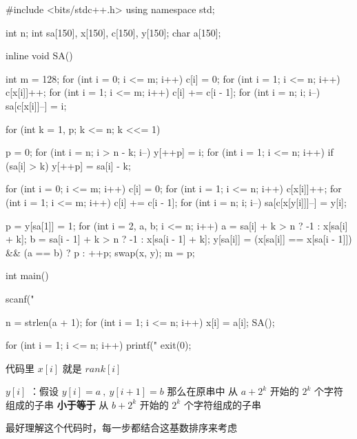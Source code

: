 \begin{cppcode}
#include <bits/stdc++.h>
using namespace std;

int n;
int sa[150], x[150], c[150], y[150];
char a[150];

inline void SA() {
  int m = 128;
  for (int i = 0; i <= m; i++) c[i] = 0;
  for (int i = 1; i <= n; i++) c[x[i]]++;
  for (int i = 1; i <= m; i++) c[i] += c[i - 1];
  for (int i = n; i; i--) sa[c[x[i]]--] = i;

  for (int k = 1, p; k <= n; k <<= 1) {
    p = 0;
    for (int i = n; i > n - k; i--) y[++p] = i;
    for (int i = 1; i <= n; i++)
      if (sa[i] > k) y[++p] = sa[i] - k;

    for (int i = 0; i <= m; i++) c[i] = 0;
    for (int i = 1; i <= n; i++) c[x[i]]++;
    for (int i = 1; i <= m; i++) c[i] += c[i - 1];
    for (int i = n; i; i--) sa[c[x[y[i]]]--] = y[i];

    p = y[sa[1]] = 1;
    for (int i = 2, a, b; i <= n; i++) {
      a = sa[i] + k > n ? -1 : x[sa[i] + k];
      b = sa[i - 1] + k > n ? -1 : x[sa[i - 1] + k];
      y[sa[i]] = (x[sa[i]] == x[sa[i - 1]]) && (a == b) ? p : ++p;
    }
    swap(x, y);
    m = p;
  }
}

int main() {
  scanf("%

  n = strlen(a + 1);
  for (int i = 1; i <= n; i++) x[i] = a[i];
  SA();

  for (int i = 1; i <= n; i++) printf("%
  exit(0);
}
\end{cppcode}

代码里 $x[i]$ 就是 $rank[i]$ 

$y[i]$ ：假设 $y[i]=a\ ,\  y[i+1]=b$ 那么在原串中 从 $a+2^k$ 开始的 $2^k$ 个字符组成的子串 \textbf{ 小于等于 } 从 $b+2^k$ 开始的 $2^k$ 个字符组成的子串

最好理解这个代码时，每一步都结合这基数排序来考虑
